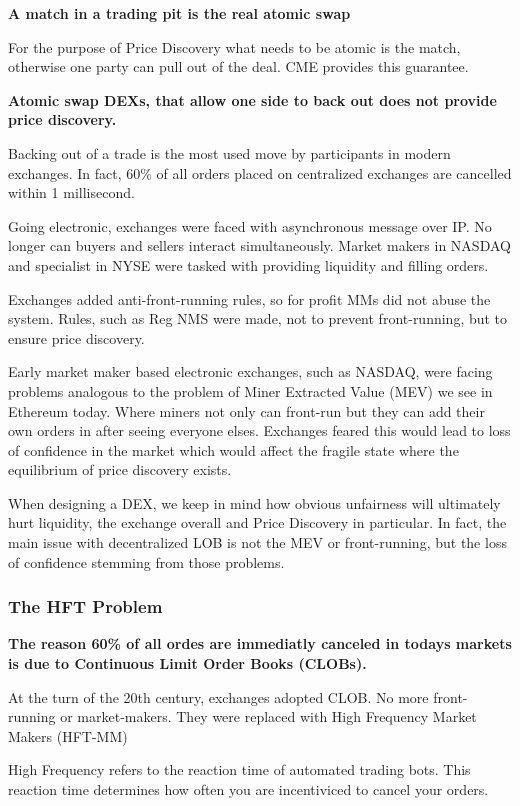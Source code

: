 \documentclass[12pt]{article}
\begin{document}
\textbf{A match in a trading pit is the real atomic swap} 

For the purpose of Price Discovery what needs to be atomic is the  match, otherwise one party can pull out of the deal. CME provides this guarantee. 

\textbf{Atomic swap DEXs, that allow one side to back out does not provide price discovery.}

Backing out of a trade is the most used move by participants in modern exchanges. In fact, 60\%  of all orders placed on centralized exchanges are cancelled within 1 millisecond. \cite{notsure}  

Going electronic, exchanges were faced with asynchronous message over IP. No longer can buyers and sellers interact simultaneously. Market makers in NASDAQ and specialist in NYSE were tasked with providing liquidity and filling orders. 

Exchanges added anti-front-running rules, so for profit MMs did not abuse the system. Rules, such as Reg NMS were made, not to prevent front-running, 
but to ensure price discovery. \cite{notsure} 

Early market maker based electronic exchanges, such as NASDAQ, were facing problems analogous to the problem of Miner Extracted Value (MEV) we see in Ethereum today. Where miners not only can front-run but they can add their own orders in after seeing everyone elses. Exchanges feared this would lead to loss of confidence in the market which would affect the fragile state where the equilibrium of price discovery exists. 

When designing a DEX, we keep in mind how obvious unfairness will ultimately hurt liquidity, the exchange overall and Price Discovery in particular. In fact, the main issue with decentralized LOB is not the MEV or front-running, but the loss of confidence stemming from those problems.  



\subsubsection*{The HFT Problem}
\textbf{The reason 60\% of all ordes are immediatly canceled in todays markets is due to Continuous Limit Order Books (CLOBs).}

At the turn of the 20th century, exchanges adopted CLOB. No more front-running or market-makers. They were replaced with High Frequency Market Makers (HFT-MM) 

High Frequency refers to the reaction time of automated trading bots. This reaction time determines how often you are incentiviced to cancel your orders. 
\end{document}
